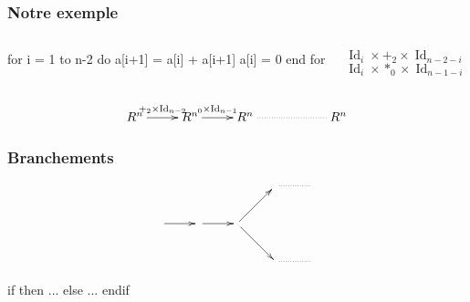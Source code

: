 \documentclass[10pt]{beamer}
\DeclareMathOperator{\Id}{Id}
\begin{document}
\begin{frame}[fragile]
  \frametitle{Notre exemple}

  \begin{columns}

    \begin{column}{0.5\textwidth}
      \begin{center}
        \begin{minipage}{0.7\textwidth}
\begin{semiverbatim}
  \alert<2>{for i = 1 to n-2 do}
    a[i+1] = a[i] + a[i+1]
    a[i] = 0
  end for
\end{semiverbatim}
        \end{minipage}
      \end{center}
    \end{column}

    \begin{column}{0.5\textwidth}
      \begin{minipage}{0.7\textwidth}
        \begin{center}
          $\phantom{ }$\\
          $\Id_{i}\times +_2 \times\Id_{n-2-i}$\\
          $\Id_i\times *_0 \times\Id_{n-1-i}$\\
        \end{center}
      \end{minipage}
    \end{column}
  \end{columns}

  \vfill

  \begin{center}
    \[\xymatrix{
      R^n\ar[r]^{+_2\times{\Id_{n-2}}} & R^n\ar[r]^{\*_0\times{\Id_{n-1}}} &
      R^{n} \ar@{.}[rr] && R^n
    }\]
  \end{center}
\end{frame}


\begin{frame}[fragile]
  \frametitle{Branchements}

  \begin{center}
    \[\xymatrix{
             &        &                 & \ar@{.}[r] & \\
      \ar[r] & \ar[r] & \ar[ru] \ar[rd] \\
             &        &                 & \ar@{.}[r] & 
    }\]
  \end{center}

  \begin{center}
    \begin{minipage}{0.7\textwidth}
\begin{semiverbatim}
  \alert<2>{if  then}
    ...
  else
    ...
  endif
\end{semiverbatim}
    \end{minipage}
  \end{center}
  
\end{frame}
\end{document}
